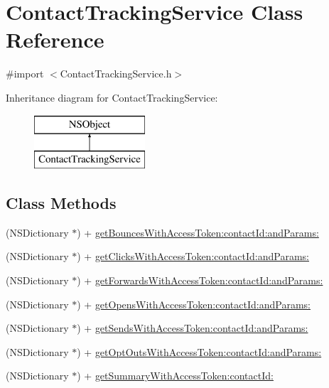 \hypertarget{interface_contact_tracking_service}{\section{Contact\-Tracking\-Service Class Reference}
\label{interface_contact_tracking_service}
}


{\ttfamily \#import $<$Contact\-Tracking\-Service.\-h$>$}

Inheritance diagram for Contact\-Tracking\-Service\-:\begin{figure}[H]
\begin{center}
\leavevmode
\includegraphics[height=2.000000cm]{interface_contact_tracking_service}
\end{center}
\end{figure}
\subsection*{Class Methods}
\begin{DoxyCompactItemize}
\item 
(N\-S\-Dictionary $\ast$) + \hyperlink{interface_contact_tracking_service_a3b2847ec31edf193a2a06960fccbce46}{get\-Bounces\-With\-Access\-Token\-:contact\-Id\-:and\-Params\-:}
\item 
(N\-S\-Dictionary $\ast$) + \hyperlink{interface_contact_tracking_service_ac962c9042c247ece057b753c125aabd1}{get\-Clicks\-With\-Access\-Token\-:contact\-Id\-:and\-Params\-:}
\item 
(N\-S\-Dictionary $\ast$) + \hyperlink{interface_contact_tracking_service_aecb1cbe83c698794dad1e1269b4fea33}{get\-Forwards\-With\-Access\-Token\-:contact\-Id\-:and\-Params\-:}
\item 
(N\-S\-Dictionary $\ast$) + \hyperlink{interface_contact_tracking_service_ac289ea7d0db5f357202a056da6438023}{get\-Opens\-With\-Access\-Token\-:contact\-Id\-:and\-Params\-:}
\item 
(N\-S\-Dictionary $\ast$) + \hyperlink{interface_contact_tracking_service_a6592d95d808aa5a5f5340d58ab5b371e}{get\-Sends\-With\-Access\-Token\-:contact\-Id\-:and\-Params\-:}
\item 
(N\-S\-Dictionary $\ast$) + \hyperlink{interface_contact_tracking_service_ac03bd2f7c6fb55e95600e3d8c39c0b5e}{get\-Opt\-Outs\-With\-Access\-Token\-:contact\-Id\-:and\-Params\-:}
\item 
(N\-S\-Dictionary $\ast$) + \hyperlink{interface_contact_tracking_service_a5f7dd65b0f69a5df91a4186b8c3bc607}{get\-Summary\-With\-Access\-Token\-:contact\-Id\-:}
\end{DoxyCompactItemize}


